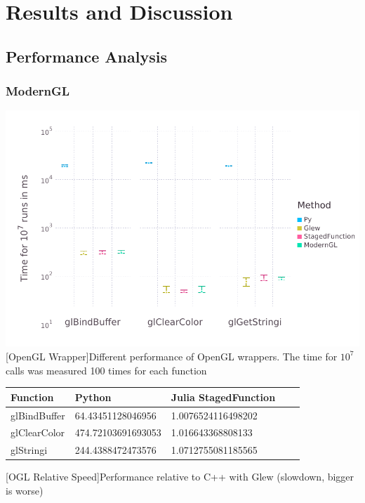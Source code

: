 \section{Results and Discussion}

\subsection{Performance Analysis}
\subsubsection{ModernGL}
\vspace{1em}
\begin{minipage}{\linewidth}
    \centering
    \includegraphics[width=0.9\linewidth]{graphics/glbench.pdf}
    [OpenGL Wrapper]{Different performance of OpenGL wrappers. The time for $10^7$ calls was measured 100 times for each function}
    \label{fig:openglwrapper}
\end{minipage}


\begin{table}[htbp]
    \centering
    \begin{tabular}{ l|l l l l }
		\textbf{Function} 	& \textbf{Python} 	 & \textbf{Julia StagedFunction} \\
		\hline
		glBindBuffer 		& 64.43451128046956  & 1.0076524116498202 \\
		glClearColor 		& 474.72103691693053 & 1.016643368808133 \\
		glStringi 			& 244.4388472473576  & 1.0712755081185565 \\
    \end{tabular}
	[OGL Relative Speed]{Performance relative to C++ with Glew (slowdown, bigger is worse)}
    \label{table:relativespeedoglw}
\end{table}

